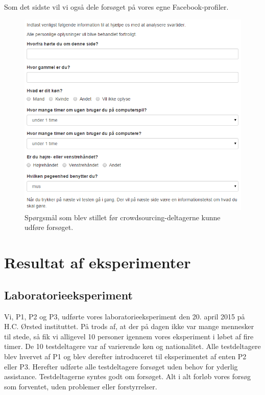 Som det sidste vil vi også dele forsøget på vores egne Facebook-profiler.
\begin{figure}[h]
\centering
\includegraphics[scale=0.7]{images/screenshots/ex_questions}
\caption{Spørgsmål som blev stillet før crowdsourcing-deltagerne kunne udføre forsøget.}
\label{fig:Questions}
\end{figure}

\section*{Resultat af eksperimenter}

\subsection*{Laboratorieeksperiment}
Vi, P1, P2 og P3, udførte vores laboratorieeksperiment den 20. april 2015 på H.C. Ørsted instituttet. På trods af, at der på dagen ikke var mange mennesker til stede, så fik vi alligevel 10 personer igennem vores eksperiment i løbet af fire timer. De 10 testdeltagere var af varierende køn og nationalitet. Alle testdeltagere blev hvervet af P1 og blev derefter introduceret til eksperimentet af enten P2 eller P3. Herefter udførte alle testdeltagere forsøget uden behov for yderlig assistance. Testdeltagerne syntes godt om forsøget. Alt i alt forløb vores forsøg som forventet, uden problemer eller forstyrrelser.


